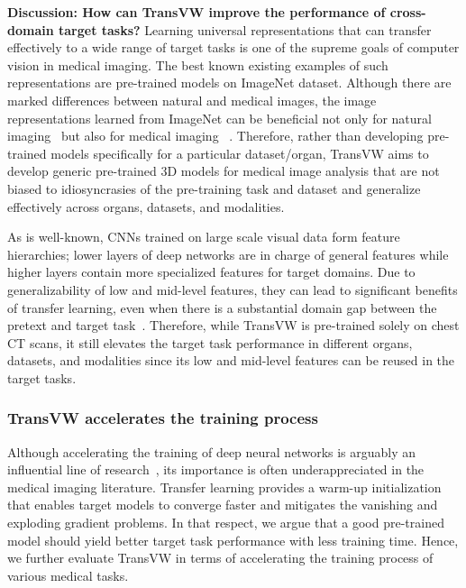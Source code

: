\documentclass[journal,twoside,web]{ieeecolor}
\begin{document}
\smallskip
\noindent\textbf{Discussion: How can TransVW improve the performance of cross-domain target tasks?}
Learning universal representations that can transfer effectively to a wide range of target tasks is one of the supreme goals  of  computer  vision  in  medical  imaging.  The  best  known  existing  examples  of  such  representations  are  pre-trained  models  on  ImageNet  dataset.  Although  there  are  marked  differences  between  natural  and  medical  images, the image representations learned from ImageNet can be beneficial not only for natural imaging~\cite{Kornblith2019Do} but also for  medical  imaging  ~\cite{tajbakhsh2016convolutional,Neyshabur2020What}.  Therefore,  rather  than  developing  pre-trained  models  specifically  for  a  particular dataset/organ,  TransVW  aims  to  develop  generic  pre-trained  3D  models  for  medical  image  analysis  that  are  not biased to idiosyncrasies of the pre-training task and dataset and generalize effectively across organs, datasets, and modalities.

As is well-known, CNNs trained on large scale visual data form feature hierarchies; lower layers of deep networks are in charge of general features while higher layers contain more specialized features for target domains\cite{yosinski2014transferable,raghu2019transfusion,Neyshabur2020What}. Due to generalizability of low and mid-level features, they can lead to significant benefits of transfer learning, even when there is a substantial domain gap between the pretext and  target  task~\cite{Neyshabur2020What, raghu2019transfusion}.  Therefore,  while  TransVW  is  pre-trained  solely  on  chest  CT  scans,  it  still  elevates  the target task performance in different organs, datasets, and modalities since its low and mid-level features can be reused in the target tasks.
 

 



\subsubsection{TransVW accelerates the training process}
\label{sec:result_annot_effic_training_time}
Although accelerating the training of deep neural networks is arguably an influential line of research~\cite{wang2019e2train}, its importance is often underappreciated in the medical imaging literature. Transfer learning provides a warm-up initialization that enables target models to converge faster and mitigates the vanishing and exploding gradient problems. 
In that respect, we  argue that a good pre-trained model should  yield better target task performance  with  less training time. Hence, we further evaluate TransVW in terms of accelerating the training process of various medical tasks. 
\end{document}

